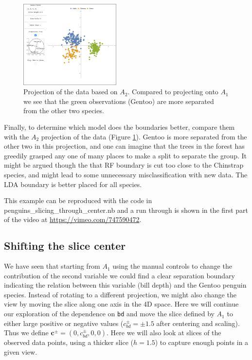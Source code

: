\documentclass[]{interact}
\theoremstyle{plain}%
\theoremstyle{definition}
\theoremstyle{remark}
\begin{document}
\begin{figure}[ht]
\centerline{\includegraphics[width=0.45\textwidth]{figures/proj2_data.png}}
\caption{Projection of the data based on $A_2$. Compared to projecting onto $A_1$ we see that the green observations (Gentoo) are more separated from the other two species.}
\label{proj2}
\end{figure}

Finally, to determine which model does the boundaries better, compare
them with the \(A_2\) projection of the data (Figure \ref{proj2}).
Gentoo is more separated from the other two in this projection, and one
can imagine that the trees in the forest has greedily grasped any one of
many places to make a split to separate the group. It might be argued
though the that RF boundary is cut too close to the Chinstrap species,
and might lead to some unnecessary misclassification with new data. The
LDA boundary is better placed for all species.

This example can be reproduced with the code in
penguins\_slicing\_through\_center.nb and a run through is shown in the
first part of the video at \url{https://vimeo.com/747590472}.

\hypertarget{shifting-the-slice-center}{%
\subsection{Shifting the slice center}\label{shifting-the-slice-center}}

We have seen that starting from \(A_1\) using the manual controls to
change the contribution of the second variable we could find a clear
separation boundary indicating the relation between this variable (bill
depth) and the Gentoo penguin species. Instead of rotating to a
different projection, we might also change the view by moving the slice
along one axis in the 4D space. Here we will continue our exploration of
the dependence on \texttt{bd} and move the slice defined by \(A_1\) to
either large positive or negative values (\(c^{\pm}_{bd} = \pm 1.5\)
after centering and scaling). Thus we define
\(\mathbf{c}^{\pm} = (0, c^{\pm}_{bd}, 0, 0)\). Here we will also look
at slices of the observed data points, using a thicker slice (\(h=1.5\))
to capture enough points in a given view.
\end{document}
